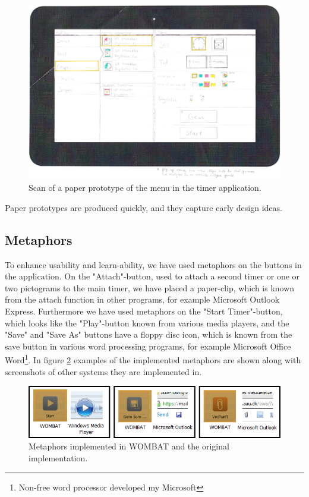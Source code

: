 	\begin{figure}[H]
		\centering
			\includegraphics[width=\textwidth]{Images/paper_prototype/menu.png}
				\caption{Scan of a paper prototype of the menu in the timer application.}
		\label{fig:pap_prot_menu}
	\end{figure}

Paper prototypes are produced quickly, and they capture early design ideas.

	\subsection{Metaphors}
	To enhance usability and learn-ability, we have used metaphors\cite{misc:designInterSys} on the buttons in the application. On the "Attach"-button, used to attach a second timer or one or two pictograms to the main timer, we have placed a paper-clip, which is known from the attach function in other programs, for example Microsoft Outlook Express. Furthermore we have used metaphors on the "Start Timer"-button, which looks like the "Play"-button known from various media players, and the "Save" and "Save As" buttons have a floppy disc icon, which is known from the save button in various word processing programs, for example Microsoft Office Word\footnote{Non-free word processor developed my Microsoft}. In figure \ref{fig:metaphors} examples of the implemented metaphors are shown along with screenshots of other systems they are implemented in.

	\begin{figure}[H]
		\centering
			\includegraphics[width=\textwidth]{Images/Implementation/wombat_metaphors.png}
				\caption{Metaphors implemented in WOMBAT and the original implementation.}
		\label{fig:metaphors}
	\end{figure}